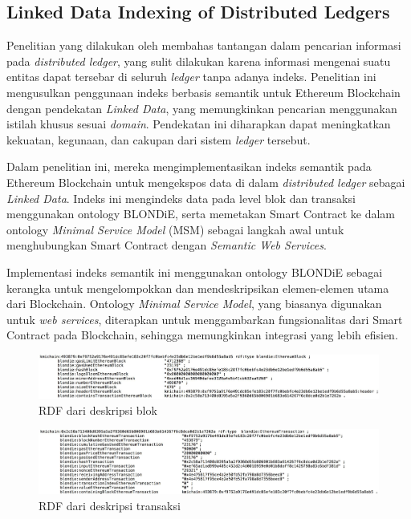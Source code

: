 \subsection{Linked Data Indexing of Distributed Ledgers}
\label{subsec:linked-data-indexing-distributed-ledgers}

Penelitian yang dilakukan oleh \cite{third2017linked} membahas tantangan dalam pencarian informasi pada \textit{distributed ledger}, yang sulit dilakukan karena informasi mengenai suatu entitas dapat tersebar di seluruh \textit{ledger} tanpa adanya indeks. Penelitian ini mengusulkan penggunaan indeks berbasis semantik untuk Ethereum Blockchain dengan pendekatan \textit{Linked Data}, yang memungkinkan pencarian menggunakan istilah khusus sesuai \textit{domain}. Pendekatan ini diharapkan dapat meningkatkan kekuatan, kegunaan, dan cakupan dari sistem \textit{ledger} tersebut.

Dalam penelitian ini, mereka mengimplementasikan indeks semantik pada Ethereum Blockchain untuk mengekspos data di dalam \textit{distributed ledger} sebagai \textit{Linked Data}. Indeks ini mengindeks data pada level blok dan transaksi menggunakan ontology BLONDiE, serta memetakan Smart Contract ke dalam ontology \textit{Minimal Service Model} (MSM) sebagai langkah awal untuk menghubungkan Smart Contract dengan \textit{Semantic Web Services}.

Implementasi indeks semantik ini menggunakan ontology BLONDiE sebagai kerangka untuk mengelompokkan dan mendeskripsikan elemen-elemen utama dari Blockchain. Ontology \textit{Minimal Service Model}, yang biasanya digunakan untuk \textit{web services}, diterapkan untuk menggambarkan fungsionalitas dari Smart Contract pada Blockchain, sehingga memungkinkan integrasi yang lebih efisien.

\begin{figure}[ht]
  \centering
  \includegraphics[width=1\textwidth]{resources/chapter-2/rdf-block.jpg}
  \caption{RDF dari deskripsi blok \parencite{third2017linked}}
  \label{image:rdf-block}
\end{figure}

\begin{figure}[ht]
  \centering
  \includegraphics[width=1\textwidth]{resources/chapter-2/rdf-transaction.jpg}
  \caption{RDF dari deskripsi transaksi \parencite{third2017linked}}
  \label{image:rdf-transaction}
\end{figure}

